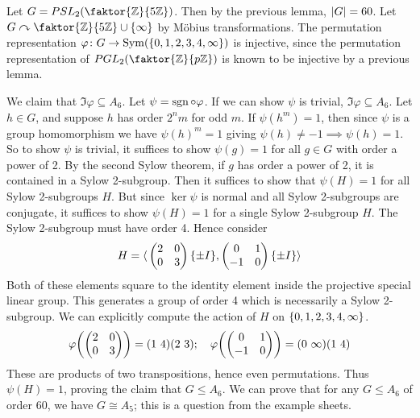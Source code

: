 \begin{example}
	Let \( G = PSL_2\qty(\faktor{\mathbb Z}{5\mathbb Z}) \).
	Then by the previous lemma, \( \abs{G} = 60 \).
	Let \( G \acts \faktor{\mathbb Z}{5\mathbb Z} \cup \qty{\infty} \) by M\"obius transformations.
	The permutation representation \( \varphi \colon G \to \operatorname{Sym}(\qty{0,1,2,3,4,\infty}) \) is injective, since the permutation representation of \( PGL_2\qty(\faktor{\mathbb Z}{p\mathbb Z}) \) is known to be injective by a previous lemma.

	We claim that \( \Im \varphi \subseteq A_6 \).
	Let \( \psi = \operatorname{sgn} \circ \varphi \).
	If we can show \( \psi \) is trivial, \( \Im \varphi \subseteq A_6 \).
	Let \( h\in G \), and suppose \( h \) has order \( 2^n m \) for odd \( m \).
	If \( \psi(h^m) = 1 \), then since \( \psi \) is a group homomorphism we have \( \psi(h)^m = 1 \) giving \( \psi(h) \neq -1 \implies \psi(h) = 1 \).
	So to show \( \psi \) is trivial, it suffices to show \( \psi(g) = 1 \) for all \( g \in G \) with order a power of 2.
	By the second Sylow theorem, if \( g \) has order a power of 2, it is contained in a Sylow 2-subgroup.
	Then it suffices to show that \( \psi(H) = 1 \) for all Sylow 2-subgroups \( H \).
	But since \( \ker \psi \) is normal and all Sylow 2-subgroups are conjugate, it suffices to show \( \psi(H) = 1 \) for a single Sylow 2-subgroup \( H \).
	The Sylow 2-subgroup must have order 4.
	Hence consider
	\[ H = \langle{}  \begin{pmatrix}
		2 & 0 \\
		0 & 3
	\end{pmatrix} \qty{\pm I}, \begin{pmatrix}
		0 & 1 \\
		-1 & 0
	\end{pmatrix} \qty{\pm I}  \rangle \]
	Both of these elements square to the identity element inside the projective special linear group.
	This generates a group of order 4 which is necessarily a Sylow 2-subgroup.
	We can explicitly compute the action of \( H \) on \( \qty{0,1,2,3,4,\infty} \).
	\[ \varphi\qty(\begin{pmatrix}
		2 & 0 \\
		0 & 3
	\end{pmatrix}) = (1\ 4)(2\ 3);\quad \varphi\qty(\begin{pmatrix}
		0 & 1 \\
		-1 & 0
	\end{pmatrix}) = (0\ \infty)(1\ 4) \]
	These are products of two transpositions, hence even permutations.
	Thus \( \psi(H) = 1 \), proving the claim that \( G \leq A_6 \).
	We can prove that for any \( G \leq A_6 \) of order 60, we have \( G \cong A_5 \); this is a question from the example sheets.
\end{example}

